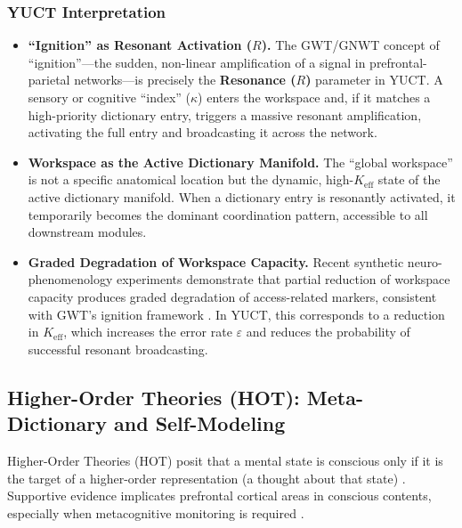 \documentclass[12pt,a4paper]{article}
\begin{document}
	\subsubsection*{YUCT Interpretation}
	\begin{itemize}
		\item \textbf{``Ignition'' as Resonant Activation (\(R\)).} The GWT/GNWT concept of ``ignition''---the sudden, non-linear amplification of a signal in prefrontal-parietal networks---is precisely the \textbf{Resonance (\(R\))} parameter in YUCT. A sensory or cognitive ``index'' (\(\kappa\)) enters the workspace and, if it matches a high-priority dictionary entry, triggers a massive resonant amplification, activating the full entry and broadcasting it across the network.
		\item \textbf{Workspace as the Active Dictionary Manifold.} The ``global workspace'' is not a specific anatomical location but the dynamic, high-\(K_{\mathrm{eff}}\) state of the active dictionary manifold. When a dictionary entry is resonantly activated, it temporarily becomes the dominant coordination pattern, accessible to all downstream modules.
		\item \textbf{Graded Degradation of Workspace Capacity.} Recent synthetic neuro-phenomenology experiments demonstrate that partial reduction of workspace capacity produces graded degradation of access-related markers, consistent with GWT's ignition framework \cite{Phua2026}. In YUCT, this corresponds to a reduction in \(K_{\mathrm{eff}}\), which increases the error rate \(\varepsilon\) and reduces the probability of successful resonant broadcasting.
	\end{itemize}
	
	\subsection{Higher-Order Theories (HOT): Meta-Dictionary and Self-Modeling}
	
	Higher-Order Theories (HOT) posit that a mental state is conscious only if it is the target of a higher-order representation (a thought about that state) \cite{Rosenthal2005}. Supportive evidence implicates prefrontal cortical areas in conscious contents, especially when metacognitive monitoring is required \cite{Seth2022}.
	
\end{document}
